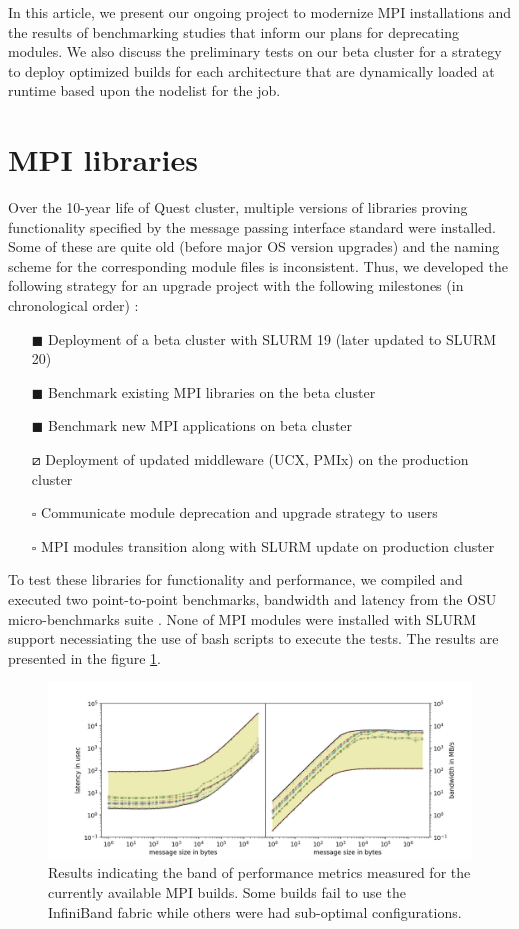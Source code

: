 \documentclass[sigconf,authordraft]{acmart}
\begin{document}
In this article, we present our ongoing project to modernize MPI installations and the results of benchmarking studies that inform our plans for deprecating modules. We also discuss the preliminary tests on our beta cluster for a strategy to deploy optimized builds for each architecture that are dynamically loaded at runtime based upon the nodelist for the job.

\section{MPI libraries}
Over the 10-year life of Quest cluster, multiple versions of libraries proving functionality specified by the message passing interface standard \cite{mpi_3_1,mpi_2_2} were installed. Some of these are quite old (before major OS version upgrades) and the naming scheme for the corresponding module files is inconsistent. Thus, we developed the following strategy for an upgrade project
with the following milestones (in chronological order) :
\begin{itemize}
	\item[$\blacksquare$] Deployment of a beta cluster with SLURM 19 (later updated to SLURM 20)
	\item[$\blacksquare$] Benchmark existing MPI libraries on the beta cluster
	\item[$\blacksquare$] Benchmark new MPI applications on beta cluster
	\item[$\boxslash$] Deployment of updated middleware (UCX, PMIx) on the production cluster
	\item[$\square$] Communicate module deprecation and upgrade strategy to users
	\item[$\square$] MPI modules transition along with SLURM update on production cluster
\end{itemize}


To test these libraries for functionality and performance, we compiled and executed two point-to-point benchmarks, bandwidth and latency from the OSU micro-benchmarks suite \cite{osu_bench_website}. None of MPI modules were installed with SLURM support necessiating the use of bash scripts to execute the tests. The results are presented in the figure \ref{fig:currmpi}.

\begin{figure}[h]
	\centering
	\includegraphics[width=\linewidth]{curr_pearc}
	\caption{Results indicating the band of performance metrics measured for the 
			 currently available MPI builds. Some builds fail to use the InfiniBand fabric while others were had sub-optimal configurations.}
	\label{fig:currmpi}
\end{figure}
\end{document}
